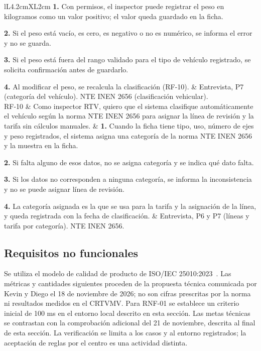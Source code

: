 \documentclass[11pt,a4paper]{article}
\begin{document}
\begin{xltabular}{\textwidth}{lL{4.2cm}XL{2cm}}
		\textbf{1.} Con permisos, el inspector puede registrar el peso en kilogramos como un valor positivo; el valor queda guardado en la ficha.\par
		\textbf{2.} Si el peso está vacío, es cero, es negativo o no es numérico, se informa el error y no se guarda.\par
		\textbf{3.} Si el peso está fuera del rango validado para el tipo de vehículo registrado, se solicita confirmación antes de guardarlo.\par
		\textbf{4.} Al modificar el peso, se recalcula la clasificación (RF-10). &
		Entrevista, P7 (categoría del vehículo). NTE INEN 2656 (clasificación vehicular). \\
		RF-10 & Como inspector RTV, quiero que el sistema clasifique automáticamente el vehículo según la norma NTE INEN 2656 para asignar la línea de revisión y la tarifa sin cálculos manuales. &
		\textbf{1.} Cuando la ficha tiene tipo, uso, número de ejes y peso registrados, el sistema asigna una categoría de la norma NTE INEN 2656 y la muestra en la ficha.\par
		\textbf{2.} Si falta alguno de esos datos, no se asigna categoría y se indica qué dato falta.\par
		\textbf{3.} Si los datos no corresponden a ninguna categoría, se informa la inconsistencia y no se puede asignar línea de revisión.\par
		\textbf{4.} La categoría asignada es la que se usa para la tarifa y la asignación de la línea, y queda registrada con la fecha de clasificación. &
		Entrevista, P6 y P7 (líneas y tarifa por categoría). NTE INEN 2656.  \\
	\end{xltabular}
	
	\subsection{Requisitos no funcionales}
	Se utiliza el modelo de calidad de producto de ISO/IEC 25010:2023~\cite{iso25010_2023}. Las métricas y cantidades siguientes proceden de la propuesta técnica comunicada por Kevin y Diego el 18 de noviembre de 2026; no son cifras prescritas por la norma ni resultados medidos en el CRTVMV. Para RNF-01 se establece un criterio inicial de 100 ms en el entorno local descrito en esta sección. Las metas técnicas se contrastan con la comprobación adicional del 21 de noviembre, descrita al final de esta sección. La verificación se limita a los casos y al entorno registrados; la aceptación de reglas por el centro es una actividad distinta.
	
\end{document}
